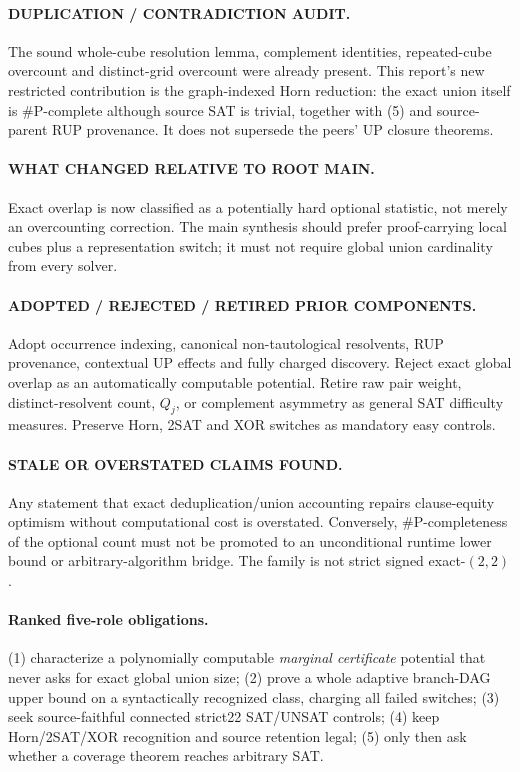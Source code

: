 \documentclass[11pt]{article}
\begin{document}
\paragraph{DUPLICATION / CONTRADICTION AUDIT.}
The sound whole-cube resolution lemma, complement identities, repeated-cube
overcount and distinct-grid overcount were already present.  This report's
new restricted contribution is the graph-indexed Horn reduction: the exact
union itself is \#P-complete although source SAT is trivial, together with
(5) and source-parent RUP provenance.  It does not supersede the peers' UP
closure theorems.

\paragraph{WHAT CHANGED RELATIVE TO ROOT MAIN.}
Exact overlap is now classified as a potentially hard optional statistic,
not merely an overcounting correction.  The main synthesis should prefer
proof-carrying local cubes plus a representation switch; it must not require
global union cardinality from every solver.

\paragraph{ADOPTED / REJECTED / RETIRED PRIOR COMPONENTS.}
Adopt occurrence indexing, canonical non-tautological resolvents, RUP
provenance, contextual UP effects and fully charged discovery.  Reject exact
global overlap as an automatically computable potential.  Retire raw pair
weight, distinct-resolvent count, $Q_j$, or complement asymmetry as general
SAT difficulty measures.  Preserve Horn, 2SAT and XOR switches as mandatory
easy controls.

\paragraph{STALE OR OVERSTATED CLAIMS FOUND.}
Any statement that exact deduplication/union accounting repairs clause-equity
optimism without computational cost is overstated.  Conversely,
\#P-completeness of the optional count must not be promoted to an
unconditional runtime lower bound or arbitrary-algorithm bridge.  The family
is not strict signed exact-$(2,2)$.

\paragraph{Ranked five-role obligations.}
(1) characterize a polynomially computable \emph{marginal certificate}
potential that never asks for exact global union size; (2) prove a whole
adaptive branch-DAG upper bound on a syntactically recognized class, charging
all failed switches; (3) seek source-faithful connected strict22 SAT/UNSAT
controls; (4) keep Horn/2SAT/XOR recognition and source retention legal;
(5) only then ask whether a coverage theorem reaches arbitrary SAT.
\end{document}
